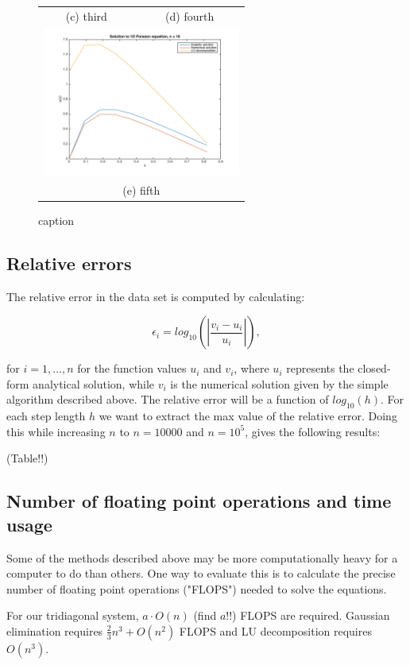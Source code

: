 \documentclass{article}
\begin{document}
\begin{multicols}{2}
\begin{figure}
\begin{tabular}{cc}
(c) third & (d) fourth \\[6pt]
\multicolumn{2}{c}{\includegraphics[width=65mm]{Plot_n10.png} }\\
\multicolumn{2}{c}{(e) fifth}
\end{tabular}
\caption{caption}
\end{figure}


\subsection{Relative errors}

The relative error in the data set is computed by calculating:

\begin{equation}
   \epsilon_i=log_{10}\left(\left|\frac{v_i-u_i}
                 {u_i}\right|\right),
\end{equation}

\noindent for $i = 1, \dots, n$ for the function values $u_i$ and $v_i$, where $u_i$ represents the closed-form analytical solution, while $v_i$ is the numerical solution given by the simple algorithm described above. The relative error will be a function of $log_{10}(h)$. For each step length $h$ we want to extract the max value of the relative error. Doing this while increasing $n$ to $n=10000$ and $n=10^5$, gives the following results:

(Table!!)


\subsection{Number of floating point operations and time usage}
Some of the methods described above may be more computationally heavy for a computer to do than others. One way to evaluate this is to calculate the precise number of floating point operations ("FLOPS") needed to solve the equations.

For our tridiagonal system, $a\cdot O(n)$ (find $a$!!) FLOPS are required. Gaussian elimination requires $\frac{2}{3}n^3 + O(n^2)$ FLOPS and LU decomposition requires$O(n^3)$. 


\end{multicols}
\end{document}
